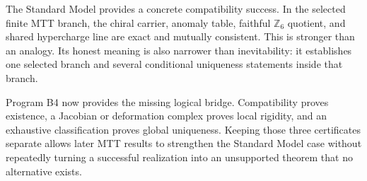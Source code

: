 \documentclass[11pt]{article}
\begin{document}
The Standard Model provides a concrete compatibility success.  In the selected
finite MTT branch, the chiral carrier, anomaly table, faithful
$\mathbb Z_6$ quotient, and shared hypercharge line are exact and mutually
consistent.  This is stronger than an analogy.  Its honest meaning is also
narrower than inevitability: it establishes one selected branch and several
conditional uniqueness statements inside that branch.

Program B4 now provides the missing logical bridge.  Compatibility proves
existence, a Jacobian or deformation complex proves local rigidity, and an
exhaustive classification proves global uniqueness.  Keeping those three
certificates separate allows later MTT results to strengthen the Standard
Model case without repeatedly turning a successful realization into an
unsupported theorem that no alternative exists.
\end{document}
